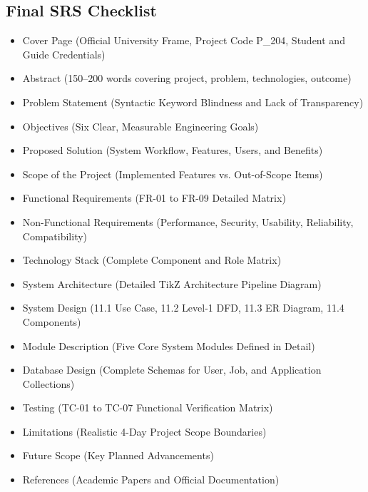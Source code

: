 \documentclass[12pt, a4paper]{article}
\begin{document}
\subsection*{Final SRS Checklist}
\begin{itemize}[label=$\square$, leftmargin=2em, itemsep=1.5pt]
    \item Cover Page (Official University Frame, Project Code P\_204, Student and Guide Credentials)
    \item Abstract (150--200 words covering project, problem, technologies, outcome)
    \item Problem Statement (Syntactic Keyword Blindness and Lack of Transparency)
    \item Objectives (Six Clear, Measurable Engineering Goals)
    \item Proposed Solution (System Workflow, Features, Users, and Benefits)
    \item Scope of the Project (Implemented Features vs. Out-of-Scope Items)
    \item Functional Requirements (FR-01 to FR-09 Detailed Matrix)
    \item Non-Functional Requirements (Performance, Security, Usability, Reliability, Compatibility)
    \item Technology Stack (Complete Component and Role Matrix)
    \item System Architecture (Detailed TikZ Architecture Pipeline Diagram)
    \item System Design (11.1 Use Case, 11.2 Level-1 DFD, 11.3 ER Diagram, 11.4 Components)
    \item Module Description (Five Core System Modules Defined in Detail)
    \item Database Design (Complete Schemas for User, Job, and Application Collections)
    \item Testing (TC-01 to TC-07 Functional Verification Matrix)
    \item Limitations (Realistic 4-Day Project Scope Boundaries)
    \item Future Scope (Key Planned Advancements)
    \item References (Academic Papers and Official Documentation)
\end{itemize}
\end{document}
